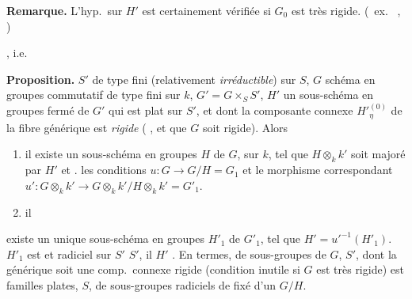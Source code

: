 \documentclass[11pt,a4paper]{article}
\begin{document}
\textbf{Remarque.} L'hyp.\ sur $H'$ est certainement vérifiée si $G_0$ est
\struck{\ill{}} très rigide. (\ ex.\ \ill{} \ill{} \ill{},
\ill{} \ill{} \ill{} \ill{})

, i.e.

\textbf{Proposition.} $S'$ de type fini \add{\ill{}} (relativement
\emph{irréductible}) sur $S$, \struck{\ill{}} $G$ schéma en groupes
commutatif de type fini sur $k$, $G' = G \times_S S'$, $H'$ un sous-schéma
en groupes fermé de $G'$ qui est \struck{\ill{}} \add{(\ill{} \ill{} \ill{})}
plat sur $S'$, et dont la composante connexe $H'^{(0)}_\eta$ de la fibre
générique est \emph{rigide} (\ill{} \ill{} \ill{}, et \ill{} que $G$
 soit rigide). Alors
\begin{enumerate}
  \item[(i)] il existe un sous-schéma en groupes $H$ de $G$, \ill{} sur $k$,
  tel que $H \otimes_k k'$ \ill{} soit majoré par $H'$ et \ill{} \ill{} \ill{}
  \ill{}. \struck{\ill{} \ill{} \ill{}} \add{\ill{}} \struck{\ill{}} \ill{}
  les conditions \ill{} \ill{} \ill{} \ill{} \ill{} \ill{}
  $u \colon G \to G/H = G_1$ et le morphisme correspondant
  $u' \colon G \otimes_k k' \to G \otimes_k k' / H \otimes_k k' = G'_1$.
  \item[(ii)] \ill{} il
\end{enumerate}

existe un unique sous-schéma en groupes  $H'_1$ de $G'_1$, tel
que $H' = u'^{-1}(H'_1)$.   $H'_1$ est
\add{\ill{}}  et radiciel sur $S'$ \struck{\ill{} \ill{} \ill{}
\ill{} \ill{} \ill{} \ill{} \ill{}} \ill{} \ill{} \ill{} $S'$, il \ill{} \ill{}
\ill{} \ill{} $H'$ \ill{} \ill{} \ill{}. 
En \ill{} termes, \ill{} \ill{} \ill{} \struck{\ill{}} \ill{} \ill{} \ill{} de
sous-groupes de $G$, \ill{} \ill{} $S'$, dont la \ill{} générique soit une
comp.\ connexe rigide (condition inutile si $G$ est très rigide) est \ill{}
\ill{} \ill{} \ill{} \ill{} \struck{\ill{}} familles plates, \ill{} \ill{}
$S$, de sous-groupes radiciels de \ill{} fixé d'un \ill{} \ill{} $G/H$.
\struck{\ill{} \ill{} \ill{} \ill{}}
\end{document}
